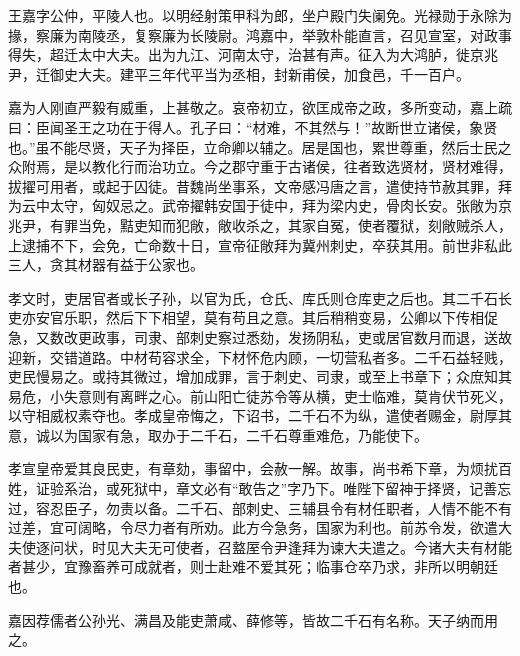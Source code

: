 \documentclass[12pt,UTF8]{ctexbook}
\begin{document}
王嘉字公仲，平陵人也。以明经射策甲科为郎，坐户殿门失阑免。光禄勋于永除为掾，察廉为南陵丞，复察廉为长陵尉。鸿嘉中，举敦朴能直言，召见宣室，对政事得失，超迁太中大夫。出为九江、河南太守，治甚有声。征入为大鸿胪，徙京兆尹，迁御史大夫。建平三年代平当为丞相，封新甫侯，加食邑，千一百户。



嘉为人刚直严毅有威重，上甚敬之。哀帝初立，欲匡成帝之政，多所变动，嘉上疏曰：臣闻圣王之功在于得人。孔子曰：“材难，不其然与！”故断世立诸侯，象贤也。”虽不能尽贤，天子为择臣，立命卿以辅之。居是国也，累世尊重，然后士民之众附焉，是以教化行而治功立。今之郡守重于古诸侯，往者致选贤材，贤材难得，拔擢可用者，或起于囚徒。昔魏尚坐事系，文帝感冯唐之言，遣使持节赦其罪，拜为云中太守，匈奴忌之。武帝擢韩安国于徒中，拜为梁内史，骨肉长安。张敞为京兆尹，有罪当免，黠吏知而犯敞，敞收杀之，其家自冤，使者覆狱，刻敞贼杀人，上逮捕不下，会免，亡命数十日，宣帝征敞拜为冀州刺史，卒获其用。前世非私此三人，贪其材器有益于公家也。



孝文时，吏居官者或长子孙，以官为氏，仓氏、库氏则仓库吏之后也。其二千石长吏亦安官乐职，然后下下相望，莫有苟且之意。其后稍稍变易，公卿以下传相促急，又数改更政事，司隶、部刺史察过悉劾，发扬阴私，吏或居官数月而退，送故迎新，交错道路。中材苟容求全，下材怀危内顾，一切营私者多。二千石益轻贱，吏民慢易之。或持其微过，增加成罪，言于刺史、司隶，或至上书章下；众庶知其易危，小失意则有离畔之心。前山阳亡徒苏令等从横，吏士临难，莫肯伏节死义，以守相威权素夺也。孝成皇帝悔之，下诏书，二千石不为纵，遣使者赐金，尉厚其意，诚以为国家有急，取办于二千石，二千石尊重难危，乃能使下。



孝宣皇帝爱其良民吏，有章劾，事留中，会赦一解。故事，尚书希下章，为烦扰百姓，证验系治，或死狱中，章文必有“敢告之”字乃下。唯陛下留神于择贤，记善忘过，容忍臣子，勿责以备。二千石、部刺史、三辅县令有材任职者，人情不能不有过差，宜可阔略，令尽力者有所劝。此方今急务，国家为利也。前苏令发，欲遣大夫使逐问状，时见大夫无可使者，召盩厔令尹逢拜为谏大夫遣之。今诸大夫有材能者甚少，宜豫畜养可成就者，则士赴难不爱其死；临事仓卒乃求，非所以明朝廷也。



嘉因荐儒者公孙光、满昌及能吏萧咸、薛修等，皆故二千石有名称。天子纳而用之。
\end{document}
